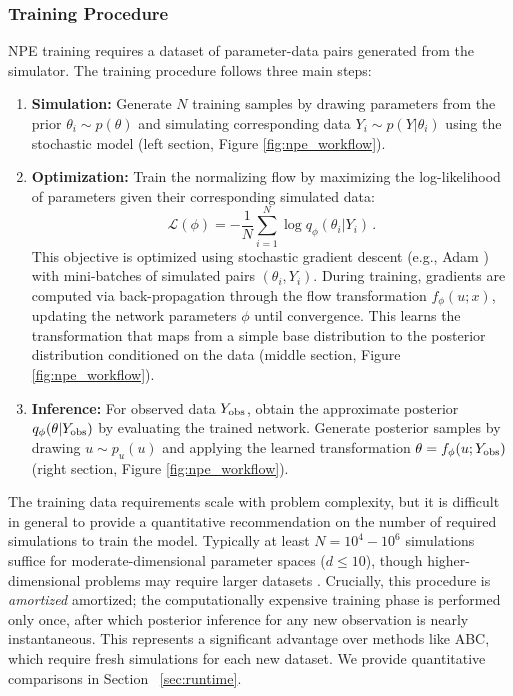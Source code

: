 \documentclass{article}
\providecommand{\DIFaddtex}[1]{{\protect\color{blue} \sf #1}} %
\providecommand{\DIFdeltex}[1]{{\protect\color{red} \scriptsize #1}} %
\providecommand{\DIFaddbegin}{} %
\providecommand{\DIFaddend}{} %
\providecommand{\DIFdelbegin}{} %
\providecommand{\DIFdelend}{} %
\providecommand{\DIFadd}[1]{\texorpdfstring{\DIFaddtex{#1}}{#1}} %
\providecommand{\DIFdel}[1]{\texorpdfstring{\DIFdeltex{#1}}{}} %
\newcommand{\DIFscaledelfig}{0.5}
\newlength{\DIFdelgraphicswidth} %
\newlength{\DIFdelgraphicsheight} %
\newcommand{\DIFaddincludegraphics}[2][]{{\color{blue}\fbox{\DIFOincludegraphics[#1]{#2}}}} %
\newcommand{\DIFdelincludegraphics}[2][]{%
\sbox{\DIFdelgraphicsbox}{\DIFOincludegraphics[#1]{#2}}%
\settoboxwidth{\DIFdelgraphicswidth}{\DIFdelgraphicsbox} %
\settoboxtotalheight{\DIFdelgraphicsheight}{\DIFdelgraphicsbox} %
\scalebox{\DIFscaledelfig}{%
\parbox[b]{\DIFdelgraphicswidth}{\usebox{\DIFdelgraphicsbox}\\[-\baselineskip] \rule{\DIFdelgraphicswidth}{0em}}\llap{\resizebox{\DIFdelgraphicswidth}{\DIFdelgraphicsheight}{%
\setlength{\unitlength}{\DIFdelgraphicswidth}%
\begin{picture}(1,1)%
\thicklines\linethickness{2pt} %
{\color[rgb]{1,0,0}\put(0,0){\framebox(1,1){}}}%
{\color[rgb]{1,0,0}\put(0,0){\line( 1,1){1}}}%
{\color[rgb]{1,0,0}\put(0,1){\line(1,-1){1}}}%
\end{picture}%
}\hspace*{3pt}}} %
} %
\DeclareRobustCommand{\DIFaddbegin}{\DIFOaddbegin \let\includegraphics\DIFaddincludegraphics} %
\DeclareRobustCommand{\DIFaddend}{\DIFOaddend \let\includegraphics\DIFOincludegraphics} %
\DeclareRobustCommand{\DIFdelbegin}{\DIFOdelbegin \let\includegraphics\DIFdelincludegraphics} %
\DeclareRobustCommand{\DIFdelend}{\DIFOaddend \let\includegraphics\DIFOincludegraphics} %
\begin{document}
\subsubsection{Training Procedure}

NPE training requires a dataset of parameter-data pairs generated from the simulator. The training procedure follows three main steps:

\begin{enumerate}
	\item \textbf{Simulation:} Generate $N$ training samples by drawing parameters from the prior $\theta_i \sim p(\theta)$ and simulating corresponding data $Y_i \sim p(Y|\theta_i)$ using the stochastic model (left section, Figure \ref{fig:npe_workflow}).

	\item \textbf{Optimization:} Train the normalizing flow by maximizing the log-likelihood of parameters given their corresponding simulated data:
	\begin{equation}
		\mathcal{L}(\phi) = -\frac{1}{N} \sum_{i=1}^N \log q_\phi(\theta_i | Y_i) \, .
	\end{equation}
This objective is optimized using stochastic gradient descent (e.g., Adam \citep{kingma2014adam}) with mini-batches of simulated pairs $(\theta_i, Y_i)$. During training, gradients are computed via back-propagation through the flow transformation $f_\phi(u; x)$, updating the network parameters $\phi$ until convergence. This learns the transformation that maps from a simple base distribution to the posterior distribution conditioned on the data (middle section, Figure \ref{fig:npe_workflow}).
	\item \textbf{Inference:} For observed data $Y_{\rm obs}$, obtain the approximate posterior $q_\phi(\theta | Y_{\rm obs})$ by evaluating the trained network. Generate posterior samples by drawing $u \sim p_u(u)$ and applying the learned transformation $\theta = f_\phi(u; Y_{\rm obs})$ (right section, Figure \ref{fig:npe_workflow}).
\end{enumerate}
The training data requirements scale with problem complexity, but it is difficult in general to provide a quantitative recommendation on the number of required simulations to train the model. Typically at least $N = 10^4 - 10^6$ simulations suffice for moderate-dimensional parameter spaces ($d \leq 10$), though higher-dimensional problems may require larger datasets \citep{2025arXiv250812939D}. Crucially, this procedure is \DIFdelbegin \DIFdel{\textit{amortized}}\DIFdelend \DIFaddbegin \DIFadd{amortized}\DIFaddend ; the computationally expensive training phase is performed only once, after which posterior inference for any new observation is nearly instantaneous. This represents a significant advantage over methods like ABC, which require fresh simulations for each new dataset. We provide quantitative comparisons in Section\DIFaddbegin \DIFadd{~}\DIFaddend \ref{sec:runtime}.
\end{document}
